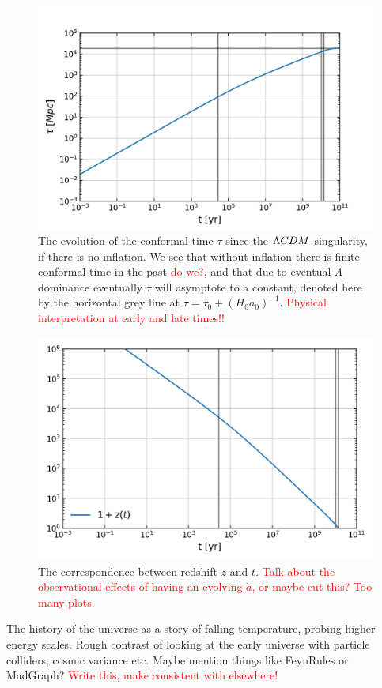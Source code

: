 \begin{figure}[!pth]
\centering     %
    \includegraphics[width=.75\columnwidth]{plots/lcdm_tau.png}
\caption{
    The evolution of the conformal time $\tau$ since the $\Lambda CDM$ singularity,
    if there is no inflation.
    We see that without inflation there is finite conformal time in the past
    \textcolor{red}{do we?},
    and that due to eventual $\Lambda$ dominance
    eventually $\tau$ will asymptote to a constant,
    denoted here by the horizontal grey line at $\tau=\tau_0+(H_0a_0)^{-1}$.
    \textcolor{red}{Physical interpretation at early and late times!!}
}\label{fig:lcdm_tau}
\end{figure}
\begin{figure}[!pth]
\centering     %
    \includegraphics[width=.75\columnwidth]{plots/lcdm_z.png}
\caption{
    The correspondence between redshift $z$ and $t$.
    \textcolor{red}{Talk about the observational effects of having an
    evolving $\dot{a}$, or maybe cut this? Too many plots.}
}\label{fig:lcdm_z}
\end{figure}

    The history of the universe as a story of falling temperature,
    probing higher energy scales. Rough contrast of looking at the
    early universe with particle colliders, cosmic variance etc.
    Maybe mention things like FeynRules or MadGraph?
    \textcolor{red}{Write this, make consistent with elsewhere!}
